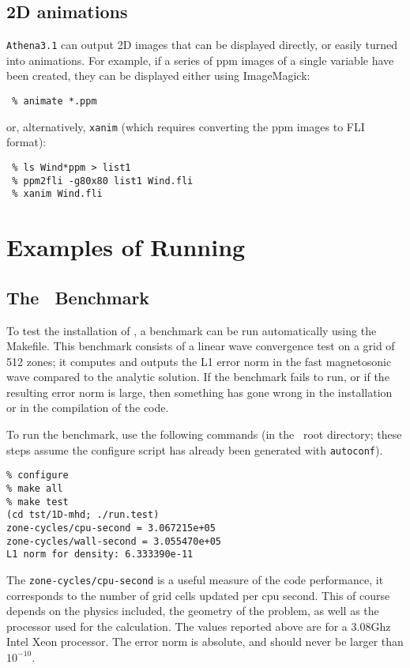 \subsection{2D animations}

{\tt Athena3.1} can output 2D images that can be displayed directly, or easily
turned into animations.  For example, if a series of ppm images of a single
variable have been created, they can be displayed either using
ImageMagick:
\begin{verbatim}
 % animate *.ppm
\end{verbatim}
or, alternatively, {\tt xanim} (which requires converting the ppm images to FLI
format):
\begin{verbatim}
 % ls Wind*ppm > list1
 % ppm2fli -g80x80 list1 Wind.fli
 % xanim Wind.fli
\end{verbatim}

\section{Examples of Running \ath}

\subsection{The \ath\ Benchmark}

To test the installation of \ath, a benchmark can be run automatically
using the Makefile.  This benchmark consists of a linear wave convergence
test on a grid of 512 zones; it computes and outputs the L1 error
norm in the fast magnetosonic wave compared to the analytic solution.
If the benchmark fails to run, or if the resulting error norm is large,
then something has gone wrong in the installation or in the compilation
of the code.

To run the benchmark, use the following commands (in the \ath\
root directory; these steps assume the configure script has already been generated with {\tt autoconf}).
\begin{verbatim}
% configure
% make all
% make test
(cd tst/1D-mhd; ./run.test)
zone-cycles/cpu-second = 3.067215e+05
zone-cycles/wall-second = 3.055470e+05
L1 norm for density: 6.333390e-11
\end{verbatim}
The {\tt zone-cycles/cpu-second} is a useful measure of the code performance,
it corresponds to the number of grid cells updated per cpu second.  This of
course depends on the physics included, the geometry of the problem, as well
as the processor used for the calculation.  The values reported above are
for a 3.08Ghz Intel Xeon processor.  The error norm is absolute, and should
never be larger than $10^{-10}$.

